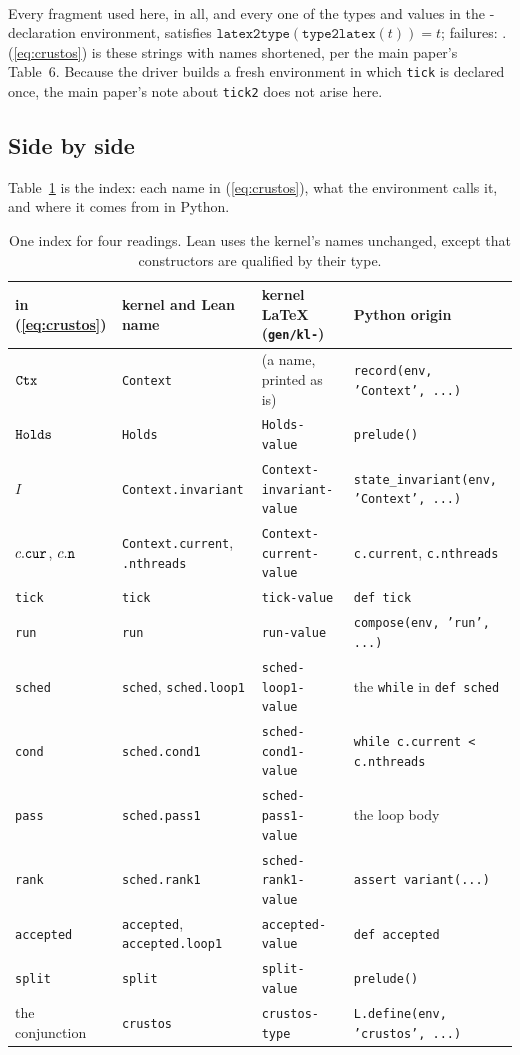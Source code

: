 \documentclass[11pt]{article}
\newcommand{\code}[1]{\texttt{#1}}
\begin{document}
{\tiny\noindent$$}
\medskip

\noindent Every fragment used here, \rtFragments{} in all, and every one of the
\rtEnvTerms{} types and values in the \envDecls-declaration environment,
satisfies $\code{latex2type}(\code{type2latex}(t)) = t$; failures:
\rtEnvFailed. (\ref{eq:crustos}) is these strings with names shortened, per
the main paper's Table~6. Because the driver builds a fresh environment in
which \code{tick} is declared once, the main paper's note about \code{tick2}
does not arise here.

\subsection{Side by side}

Table~\ref{tab:corr} is the index: each name in (\ref{eq:crustos}), what the
environment calls it, and where it comes from in Python.

\begin{table}[h]
\centering
\scriptsize
\begin{tabular}{llll}
\toprule
in (\ref{eq:crustos}) & kernel and Lean name & kernel \LaTeX{} (\code{gen/kl-}) & Python origin \\
\midrule
$\ctx$ & \code{Context} & (a name, printed as is) & \code{record(env, 'Context', ...)} \\
$\hld$ & \code{Holds} & \code{Holds-value} & \code{prelude()} \\
$I$ & \code{Context.invariant} & \code{Context-invariant-value} & \code{state\_invariant(env, 'Context', ...)} \\
$\cur{c}$, $\nth{c}$ & \code{Context.current}, \code{.nthreads} & \code{Context-current-value} & \code{c.current}, \code{c.nthreads} \\
\code{tick} & \code{tick} & \code{tick-value} & \code{def tick} \\
\code{run} & \code{run} & \code{run-value} & \code{compose(env, 'run', ...)} \\
\code{sched} & \code{sched}, \code{sched.loop1} & \code{sched-loop1-value} & the \code{while} in \code{def sched} \\
\code{cond} & \code{sched.cond1} & \code{sched-cond1-value} & \code{while c.current < c.nthreads} \\
\code{pass} & \code{sched.pass1} & \code{sched-pass1-value} & the loop body \\
\code{rank} & \code{sched.rank1} & \code{sched-rank1-value} & \code{assert variant(...)} \\
\code{accepted} & \code{accepted}, \code{accepted.loop1} & \code{accepted-value} & \code{def accepted} \\
\code{split} & \code{split} & \code{split-value} & \code{prelude()} \\
the conjunction & \code{crustos} & \code{crustos-type} & \code{L.define(env, 'crustos', ...)} \\
\bottomrule
\end{tabular}
\caption{One index for four readings. Lean uses the kernel's names unchanged,
except that constructors are qualified by their type.}
\label{tab:corr}
\end{table}
\end{document}

